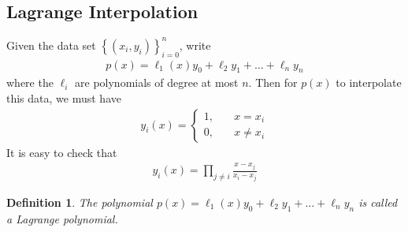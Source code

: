 \documentclass[12pt,reqno]{amsart}
\numberwithin{equation}{section}  %
\newtheorem*{definition}{Definition}
\begin{document}
\subsection{Lagrange Interpolation}
Given the data set $ \left\{ (x_i, y_i) \right\}_{i=0}^{n}$,
write
\begin{align*}
p(x) = \ell_1(x) y_0 + \ell_2 y_1 + \ldots + \ell_n y_n
\end{align*}
where the $\ell_i$ are polynomials of degree at most $n$. 
Then for $p(x)$ to interpolate this data, we must have
\begin{align*}
y_i(x) = \begin{cases}
1, \quad & x = x_i \\
0, \quad & x \neq x_i
\end{cases}
\end{align*}
It is easy to check that
\begin{align*}
y_i(x) = \prod_{j \neq i} \frac{x - x_j}{x_i - x_j}
\end{align*}
\begin{definition}
The polynomial $p(x) = \ell_1(x) y_0 + \ell_2 y_1 + \ldots + \ell_n y_n$
is called a \emph{Lagrange polynomial}.
\end{definition}
\end{document}
